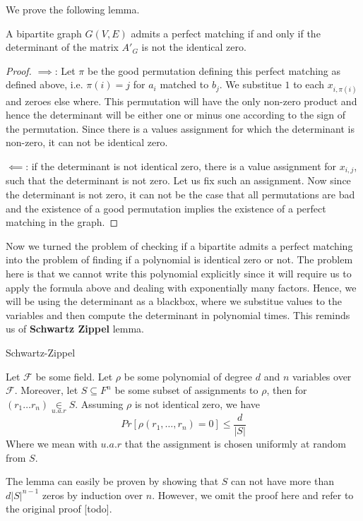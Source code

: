 	We prove the following lemma.
	\begin{lemma}
		A bipartite graph $G(V, E)$ admits a perfect matching if and only if the determinant of the matrix $A'_G$ is not the identical zero.
	\end{lemma}
	\begin{proof}
		$\implies$: Let $\pi$ be the good permutation defining this perfect matching as defined above, i.e. $\pi(i) = j$ for $a_i$ matched to $b_j$. We substitue $1$ to each $x_{i, \pi(i)}$ and zeroes else where. This permutation will have the only non-zero product and hence the determinant will be either one or minus one according to the sign of the permutation. Since there is a values assignment for which the determinant is non-zero, it can not be identical zero.

		$\impliedby$: if the determinant is not identical zero, there is a value assignment for $x_{i, j}$, such that the determinant is not zero. Let us fix such an assignment. Now since the determinant is not zero, it can not be the case that all permutations are bad and the existence of a good permutation implies the existence of a perfect matching in the graph. 
	\end{proof}

	Now we turned the problem of checking if a bipartite admits a perfect matching into the problem of finding if a polynomial is identical zero or not. The problem here is that we cannot write this polynomial explicitly since it will require us to apply the formula above and dealing with exponentially many factors. Hence, we will be using the determinant as a blackbox, where we substitue values to the variables and then compute the determinant in polynomial times. This reminds us of \textbf{Schwartz Zippel} lemma.


	\begin{lemma}
		Schwartz-Zippel

		Let $\mathcal{F}$ be some field. Let $\rho$ be some polynomial of degree $d$ and $n$ variables over $\mathcal{F}$. Moreover, let $S \subseteq F^{n}$ be some subset of assignments to $\rho$, then for $(r_1 \dots r_n) \underset{u.a.r}{\in}S$. Assuming $\rho$ is not identical zero, we have
		$$Pr\left[\rho(r_1, \dots, r_n) = 0\right] \leq \frac{d}{|S|}$$
		Where we mean with $u.a.r$ that the assignment is chosen uniformly at random from $S$.
	\end{lemma}
	The lemma can easily be proven by showing that $S$ can not have more than $d |S|^{n-1}$ zeros by induction over $n$. However, we omit the proof here and refer to the original proof [todo].

